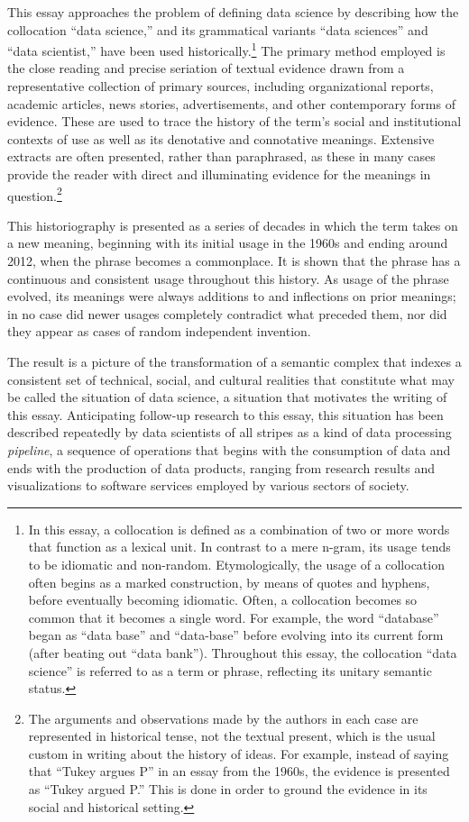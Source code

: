 \documentclass[
  letterpaper,
]{report}
\begin{document}
This essay approaches the problem of defining data science by describing
how the collocation ``data science,'' and its grammatical variants
``data sciences'' and ``data scientist,'' have been used
historically.\footnote{In this essay, a collocation is defined as a
  combination of two or more words that function as a lexical unit. In
  contrast to a mere n-gram, its usage tends to be idiomatic and
  non-random. Etymologically, the usage of a collocation often begins as
  a marked construction, by means of quotes and hyphens, before
  eventually becoming idiomatic. Often, a collocation becomes so common
  that it becomes a single word. For example, the word ``database''
  began as ``data base'' and ``data-base'' before evolving into its
  current form (after beating out ``data bank''). Throughout this essay,
  the collocation ``data science'' is referred to as a term or phrase,
  reflecting its unitary semantic status.} The primary method employed
is the close reading and precise seriation of textual evidence drawn
from a representative collection of primary sources, including
organizational reports, academic articles, news stories, advertisements,
and other contemporary forms of evidence. These are used to trace the
history of the term's social and institutional contexts of use as well
as its denotative and connotative meanings. Extensive extracts are often
presented, rather than paraphrased, as these in many cases provide the
reader with direct and illuminating evidence for the meanings in
question.\footnote{The arguments and observations made by the authors in
  each case are represented in historical tense, not the textual
  present, which is the usual custom in writing about the history of
  ideas. For example, instead of saying that ``Tukey argues P'' in an
  essay from the 1960s, the evidence is presented as ``Tukey argued P.''
  This is done in order to ground the evidence in its social and
  historical setting.}

This historiography is presented as a series of decades in which the
term takes on a new meaning, beginning with its initial usage in the
1960s and ending around 2012, when the phrase becomes a commonplace. It
is shown that the phrase has a continuous and consistent usage
throughout this history. As usage of the phrase evolved, its meanings
were always additions to and inflections on prior meanings; in no case
did newer usages completely contradict what preceded them, nor did they
appear as cases of random independent invention.

The result is a picture of the transformation of a semantic complex that
indexes a consistent set of technical, social, and cultural realities
that constitute what may be called the situation of data science, a
situation that motivates the writing of this essay. Anticipating
follow-up research to this essay, this situation has been described
repeatedly by data scientists of all stripes as a kind of data
processing \emph{pipeline}, a sequence of operations that begins with
the consumption of data and ends with the production of data products,
ranging from research results and visualizations to software services
employed by various sectors of society.
\end{document}
